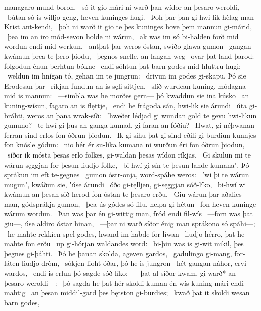 managaro mund-boron, \hld\ só it gio mári ni warð
þan wídor an þesaro weroldi, \hld\ bútan só is willjo geng,
heven-kuninges hugi. \hld\ Þoh þar þan gi-hwi-lik hèlag man
Krist ant-kendi, \hld\ þoh ni warð it gio te þes kuninges hove
þem mannun gi-márid, \hld\ þea im an iro mód-sevon
holde ni wárun, \hld\ ak was im só bi-halden forð
mid wordun endi mid werkun, \hld\ antþat þar weros óstan,
swíðo glawa gumon \hld\ gangan kwámun
þrea te þero þiodu, \hld\ þegnos snelle,
an langan weg \hld\ ovar þat land þarod:
folgodun énun berhtun bókne \hld\ endi sóhtun þat barn godes
mid hluttru hugi: \hld\ weldun im hnígan tó,
gehan im te jungrun: \hld\ drivun im godes gi-skapu.
Þó sie Erodesan þar \hld\ ríkjan fundun
an is sęli sittjen, \hld\ slíð-wurdean kuning,
módagna mid is mannun: \hld\ —simbla was he morðes gern—
þó kwaddun sie ina kúsko \hld\ an kuning-wísun,
fagaro an is flęttje, \hld\ endi he frágoda sán,
hwi-lik sie árundi \hld\ úta gi-bráhti,
weros an þana wrak-síð: \hld\ ʽhweðer lédjad gi wundan gold
te gevu hwi-likun gumuno? \hld\ te hwí gi þus an ganga kumad,
gi-faran an fóðiu? \hld\ Hwat, gi néþwanan ferran sind
erlos fon óðrun þiodun. \hld\ Ik gi-sihu þat gi sind eðili-gi-burdiun
kunnjes fon knósle gódun: \hld\ nio hér ér su-lika kumana ni wurðun
éri fon óðrun þiodun, \hld\ síðor ik mósta þesas erlo folkes,
gi-waldan þesas wídon ríkjas. \hld\ Gi skulun mi te wárun sęggjan
for þesun liudjo folke, \hld\ bi-hwí gi sín te þesun lande kumanaʼ.
Þó sprákun im eft te-gegnes \hld\ gumon óstr-onja,
word-spáhe weros: \hld\ ʽwi þi te wárun mugunʼ, kwáðun sie,
ʽúse árundi \hld\ óðo gi-tęlljen,
gi-sęggjan sóð-líko, \hld\ bi-hwí wi kwámun an þesan sið herod
fon óstan te þesaro erðu. \hld\ Giu wárun þar aðalies man,
gódsprákja gumon, \hld\ þea ús gódes só filu,
helpa gi-hétun \hld\ fon heven-kuninge
wárum wordun. \hld\ Þan was þar én gi-wittig man,
fród endi fil-wís \hld\ —forn was þat giu—,
úse aldiro óstar hinan, \hld\ —þar ni warð síðor énig man
sprákono só spáhi—; \hld\ he mahte rekkien spel godes,
hwand im habde for-liwan \hld\ liudjo hérro,
þat he mahte fon erðu \hld\ up gi-hórjan
waldandes word: \hld\ bi-þiu was is gi-wit mikil,
þes þegnes gi-þáhti. \hld\ Þó he þanan skolda,
ageven gardos, \hld\ gadulingo gi-mang,
for-láten liudjo dròm, \hld\ sókjen lioht óðar,
þó he is jungron \hld\ hét gangan náhor,
ervi-wardos, \hld\ endi is erlun þó
sagde sóð-líko: \hld\ —þat al síðor kwam,
gi-warð* an þesaro weroldi—: \hld\ þó sagda he þat hér skoldi kuman én wís-kuning
mári endi mahtig \hld\ an þesan middil-gard
þes bętston gi-burdies; \hld\ kwað þat it skoldi wesan barn godes,
